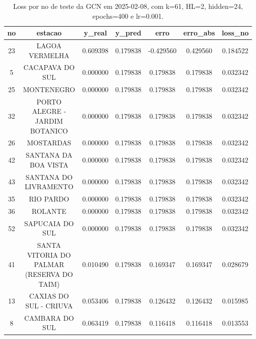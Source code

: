 \begin{table}[h]
\centering
\caption{Loss por no de teste da GCN em 2025-02-08, com k=61, HL=2, hidden=24, epochs=400 e lr=0.001.}
\label{tab:gcn_loss_k61_hl2_h24_e400_d20250208}
\begin{tabular}{ccccccc}
\toprule
no & estacao & y\_real & y\_pred & erro & erro\_abs & loss\_no \\
\midrule
23 & LAGOA VERMELHA & 0.609398 & 0.179838 & -0.429560 & 0.429560 & 0.184522 \\
5 & CACAPAVA DO SUL & 0.000000 & 0.179838 & 0.179838 & 0.179838 & 0.032342 \\
25 & MONTENEGRO & 0.000000 & 0.179838 & 0.179838 & 0.179838 & 0.032342 \\
32 & PORTO ALEGRE - JARDIM BOTANICO & 0.000000 & 0.179838 & 0.179838 & 0.179838 & 0.032342 \\
26 & MOSTARDAS & 0.000000 & 0.179838 & 0.179838 & 0.179838 & 0.032342 \\
42 & SANTANA DA BOA VISTA & 0.000000 & 0.179838 & 0.179838 & 0.179838 & 0.032342 \\
43 & SANTANA DO LIVRAMENTO & 0.000000 & 0.179838 & 0.179838 & 0.179838 & 0.032342 \\
35 & RIO PARDO & 0.000000 & 0.179838 & 0.179838 & 0.179838 & 0.032342 \\
36 & ROLANTE & 0.000000 & 0.179838 & 0.179838 & 0.179838 & 0.032342 \\
52 & SAPUCAIA DO SUL & 0.000000 & 0.179838 & 0.179838 & 0.179838 & 0.032342 \\
41 & SANTA VITORIA DO PALMAR (RESERVA DO TAIM) & 0.010490 & 0.179838 & 0.169347 & 0.169347 & 0.028679 \\
13 & CAXIAS DO SUL - CRIUVA & 0.053406 & 0.179838 & 0.126432 & 0.126432 & 0.015985 \\
8 & CAMBARA DO SUL & 0.063419 & 0.179838 & 0.116418 & 0.116418 & 0.013553 \\
\bottomrule
\end{tabular}
\end{table}
